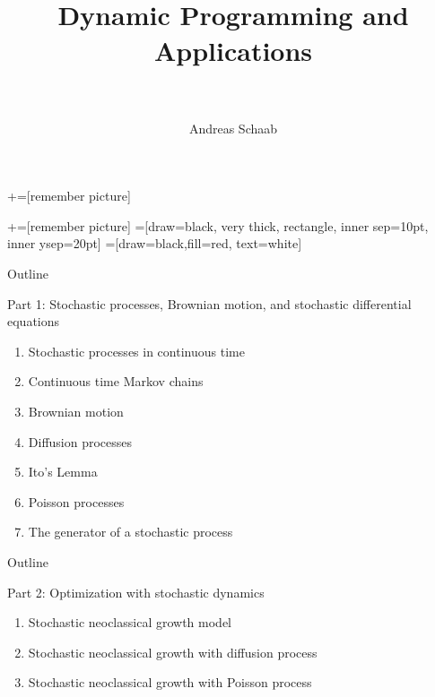\documentclass[11pt, aspectratio=169]{beamer}
\title[]{\\[8pt]
	{\large \color{blue} Dynamic Programming and Applications \\[5pt] \normalfont{Stochastic Dynamic Programming in Continuous Time} \\[10pt] \normalfont{Lectures 5 -- 6}}}
\author[Schaab]{Andreas Schaab}
\institute{}
\date{}
\begin{document}
+=[remember picture]

\newcommand\marktopleft[1]{%
	\tikz[overlay,remember picture] 
	\node (marker-#1-a) at (-.3em,.3em) {};%
}
\newcommand\markbottomright[2]{%
	\tikz[overlay,remember picture] 
	\node (marker-#1-b) at (0em,0em) {};%
}
+=[remember picture] 
 =[draw=black, very thick, rectangle, inner sep=10pt, inner ysep=20pt]
 =[draw=black,fill=red, text=white]


\addtocounter{framenumber}{-1}
\thispagestyle{empty}
\maketitle 
\newpage




\begin{frame}{Outline}
\thispagestyle{empty}
\addtocounter{framenumber}{-1}

Part 1: Stochastic processes, Brownian motion, and stochastic differential equations
\begin{enumerate}
	\item Stochastic processes in continuous time
	\item Continuous time Markov chains
	\item Brownian motion
	\item Diffusion processes 
	\item Ito's Lemma
	\item Poisson processes
	\item The generator of a stochastic process
\end{enumerate}

\end{frame}


\begin{frame}{Outline}
\thispagestyle{empty}
\addtocounter{framenumber}{-1}

Part 2: Optimization with stochastic dynamics
\begin{enumerate}
	\item Stochastic neoclassical growth model
	\item Stochastic neoclassical growth with diffusion process
	\item Stochastic neoclassical growth with Poisson process
\end{enumerate}

\end{frame}
\end{document}
